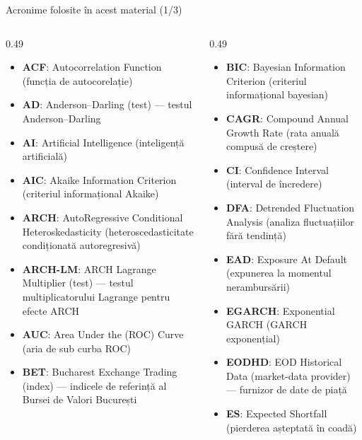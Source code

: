 {
\begin{frame}[noframenumbering]
    \titlepage
\end{frame}
}
\begin{frame}{Acronime folosite în acest material (1/3)}
\begin{columns}[T]
\begin{column}{0.49\textwidth}
\begin{itemize}\setlength{\itemsep}{0pt}
    \item \textbf{ACF}: Autocorrelation Function (funcția de autocorelație)
    \item \textbf{AD}: Anderson–Darling (test) — testul Anderson–Darling
    \item \textbf{AI}: Artificial Intelligence (inteligență artificială)
    \item \textbf{AIC}: Akaike Information Criterion (criteriul informațional Akaike)
    \item \textbf{ARCH}: AutoRegressive Conditional Heteroskedasticity (heteroscedasticitate condiționată autoregresivă)
    \item \textbf{ARCH-LM}: ARCH Lagrange Multiplier (test) — testul multiplicatorului Lagrange pentru efecte ARCH
    \item \textbf{AUC}: Area Under the (ROC) Curve (aria de sub curba ROC)
    \item \textbf{BET}: Bucharest Exchange Trading (index) — indicele de referință al Bursei de Valori București
\end{itemize}
\end{column}
\begin{column}{0.49\textwidth}
\begin{itemize}\setlength{\itemsep}{0pt}
    \item \textbf{BIC}: Bayesian Information Criterion (criteriul informațional bayesian)
    \item \textbf{CAGR}: Compound Annual Growth Rate (rata anuală compusă de creștere)
    \item \textbf{CI}: Confidence Interval (interval de încredere)
    \item \textbf{DFA}: Detrended Fluctuation Analysis (analiza fluctuațiilor fără tendință)
    \item \textbf{EAD}: Exposure At Default (expunerea la momentul nerambursării)
    \item \textbf{EGARCH}: Exponential GARCH (GARCH exponențial)
    \item \textbf{EODHD}: EOD Historical Data (market-data provider) — furnizor de date de piață
    \item \textbf{ES}: Expected Shortfall (pierderea așteptată în coadă)
\end{itemize}
\end{column}
\end{columns}
\end{frame}
